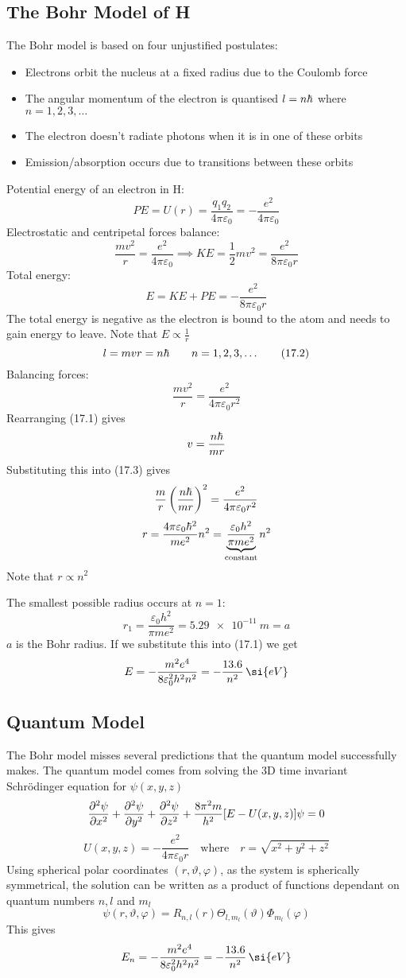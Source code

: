 \section{}

\subsection*{The Bohr Model of H}

The Bohr model is based on four unjustified postulates:
\begin{itemize}
\item Electrons orbit the nucleus at a fixed radius due to the Coulomb force
\item The angular momentum of the electron is quantised \(l=n\hb\) where \(n=1,2,3,\dots\)
\item The electron doesn't radiate photons when it is in one of these orbits
\item Emission/absorption occurs due to transitions between these orbits
\end{itemize}
Potential energy of an electron in H:
\[PE=U(r)=\frac{q_1q_2}{4\pi\varepsilon_0}=-\frac{e^2}{4\pi\varepsilon_0}\]
Electrostatic and centripetal forces balance:
\[\frac{mv^2}{r}=\frac{e^2}{4\pi\varepsilon_0}\implies KE = \frac 12mv^2=\frac{e^2}{8\pi\varepsilon_0r}\]
Total energy:
\[E=KE+PE=-\frac{e^2}{8\pi\varepsilon_0r}\tag{17.1}\]
The total energy is negative as the electron is bound to the atom and needs to gain energy to leave. Note that \(E\propto\frac 1r\)
\[l=mvr=n\hb\qquad n=1,2,3,\dots\tag{17.2}\]
Balancing forces:
\[\frac{mv^2}{r}=\frac{e^2}{4\pi\varepsilon_0r^2}\tag{17.3}\]
Rearranging (17.1) gives
\[v=\frac{n\hb}{mr}\]
Substituting this into (17.3) gives
\[\frac mr\left(\frac{n\hb}{mr}\right)^2=\frac{e^2}{4\pi\varepsilon_0r^2}\]
\[r=\frac{4\pi\varepsilon_0\hb^2}{me^2}n^2=\underbrace{\frac{\varepsilon_0h^2}{\pi me^2}}_{\text{constant}}n^2\]
Note that \(r\propto n^2\)

The smallest possible radius occurs at \(n=1\):
\[r_1=\frac{\varepsilon_0h^2}{\pi me^2}=\SI{5.29e-11}{m}=a\]
\(a\) is the Bohr radius. If we substitute this into (17.1) we get
\[E=-\frac{m^2e^4}{8\varepsilon_0^2h^2n^2}=-\frac{13.6}{n^2}\mskip3mu\si{eV}\]

\subsection*{Quantum Model}

The Bohr model misses several predictions that the quantum model successfully makes. The quantum model comes from solving the 3D time invariant Schr\"odinger equation for \(\psi(x,y,z)\)
\[\pd[2]{\psi}{x}+\pd[2]{\psi}{y}+\pd[2]{\psi}{z}+\frac{8\pi^2m}{h^2}[E-U(x,y,z)]\psi=0\]
\[U(x,y,z)=-\frac{e^2}{4\pi\varepsilon_0r}\quad\text{where}\quad r=\sqrt{x^2+y^2+z^2}\]
Using spherical polar coordinates \((r,\vartheta,\varphi)\), as the system is spherically symmetrical, the solution can be written as a product of functions dependant on quantum numbers \(n,l\) and \(m_l\)
\[\psi(r,\vartheta,\varphi)=R_{n,l}(r)\Theta_{l,m_l}(\vartheta)\Phi_{m_l}(\varphi)\]
This gives
\[E_n=-\frac{m^2e^4}{8\varepsilon_0^2h^2n^2}=-\frac{13.6}{n^2}\mskip3mu\si{eV}\]

